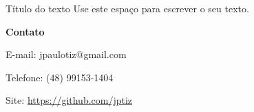\begin{frame}{Título do texto}
    Use este espaço para escrever o seu texto.
\end{frame}

{
\begin{frame}[plain]
    \vspace{15mm}
    \begin{center}
        \textcolor{cinza}{\textbf{Contato}}
    \end{center}
    \vspace{-6mm}
    \begin{center}
    \textcolor{cinza}{
        \scriptsize{E-mail: jpaulotiz@gmail.com}}
    \end{center}
    \vspace{-6mm}
    \begin{center}
    \textcolor{cinza}{\scriptsize{Telefone: (48) 99153-1404}}
    \end{center}
    \vspace{-6mm}
    \begin{center}
    \textcolor{cinza}{\scriptsize{
        Site: \url{https://github.com/jptiz}
    }}
    \end{center}
\end{frame}
}



